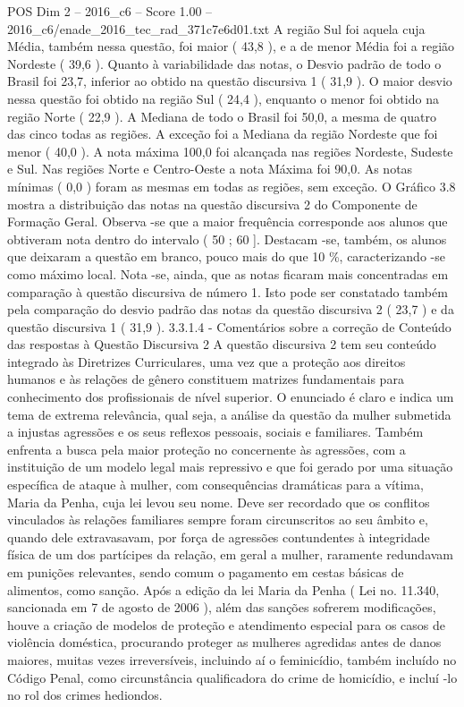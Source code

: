 \begin{textsample}{POS Dim 2 – 2016\_c6 – Score 1.00 – 2016\_c6/enade\_2016\_tec\_rad\_371c7e6d01.txt}
A região Sul foi aquela cuja Média, também nessa questão, foi maior ( 43,8 ), e a de menor Média foi a região Nordeste ( 39,6 ).
Quanto à variabilidade das notas, o Desvio padrão de todo o Brasil foi 23,7, inferior ao obtido na questão discursiva 1 ( 31,9 ).
O maior desvio nessa questão foi obtido na região Sul ( 24,4 ), enquanto o menor foi obtido na região Norte ( 22,9 ).
A Mediana de todo o Brasil foi 50,0, a mesma de quatro das cinco todas as regiões.
A exceção foi a Mediana da região Nordeste que foi menor ( 40,0 ).
A nota máxima 100,0 foi alcançada nas regiões Nordeste, Sudeste e Sul.
Nas regiões Norte e Centro-Oeste a nota Máxima foi 90,0.
As notas mínimas ( 0,0 ) foram as mesmas em todas as regiões, sem exceção.
O Gráfico 3.8 mostra a distribuição das notas na questão discursiva 2 do Componente de Formação Geral.
Observa -se que a maior frequência corresponde aos alunos que obtiveram nota dentro do intervalo ( 50 ; 60 ].
Destacam -se, também, os alunos que deixaram a questão em branco, pouco mais do que 10 \%, caracterizando -se como máximo local.
Nota -se, ainda, que as notas ficaram mais concentradas em comparação à questão discursiva de número 1.
Isto pode ser constatado também pela comparação do desvio padrão das notas da questão discursiva 2 ( 23,7 ) e da questão discursiva 1 ( 31,9 ). 3.3.1.4 - Comentários sobre a correção de Conteúdo das respostas à Questão Discursiva 2 A questão discursiva 2 tem seu conteúdo integrado às Diretrizes Curriculares, uma vez que a proteção aos direitos humanos e às relações de gênero constituem matrizes fundamentais para conhecimento dos profissionais de nível superior.
O enunciado é claro e indica um tema de extrema relevância, qual seja, a análise da questão da mulher submetida a injustas agressões e os seus reflexos pessoais, sociais e familiares.
Também enfrenta a busca pela maior proteção no concernente às agressões, com a instituição de um modelo legal mais repressivo e que foi gerado por uma situação específica de ataque à mulher, com consequências dramáticas para a vítima, Maria da Penha, cuja lei levou seu nome.
Deve ser recordado que os conflitos vinculados às relações familiares sempre foram circunscritos ao seu âmbito e, quando dele extravasavam, por força de agressões contundentes à integridade física de um dos partícipes da relação, em geral a mulher, raramente redundavam em punições relevantes, sendo comum o pagamento em cestas básicas de alimentos, como sanção.
Após a edição da lei Maria da Penha ( Lei no. 11.340, sancionada em 7 de agosto de 2006 ), além das sanções sofrerem modificações, houve a criação de modelos de proteção e atendimento especial para os casos de violência doméstica, procurando proteger as mulheres agredidas antes de danos maiores, muitas vezes irreversíveis, incluindo aí o feminicídio, também incluído no Código Penal, como circunstância qualificadora do crime de homicídio, e incluí -lo no rol dos crimes hediondos.

\end{textsample}
